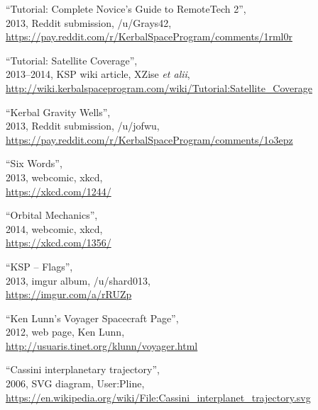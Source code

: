 \begin{thebibliography}{99}
“Tutorial: Complete Novice's Guide to RemoteTech 2”, \\
2013, Reddit submission, /u/Grays42, \\
\url{https://pay.reddit.com/r/KerbalSpaceProgram/comments/1rml0r}

“Tutorial: Satellite Coverage”, \\
2013--2014, KSP wiki article, XZise \emph{et alii}, \\
{\small\url{http://wiki.kerbalspaceprogram.com/wiki/Tutorial:Satellite_Coverage}}

“Kerbal Gravity Wells”, \\
2013, Reddit submission, /u/jofwu, \\
\url{https://pay.reddit.com/r/KerbalSpaceProgram/comments/1o3epz}

“Six Words”, \\
2013, webcomic, xkcd, \\
\url{https://xkcd.com/1244/}

“Orbital Mechanics”, \\
2014, webcomic, xkcd, \\
\url{https://xkcd.com/1356/}

“KSP -- Flags”, \\
2013, imgur album, /u/shard013, \\
\url{https://imgur.com/a/rRUZp}

“Ken Lunn's Voyager Spacecraft Page”, \\
2012, web page, Ken Lunn, \\
\url{http://usuaris.tinet.org/klunn/voyager.html}

“Cassini interplanetary trajectory”, \\
2006, SVG diagram, User:Pline, \\
{\footnotesize\url{https://en.wikipedia.org/wiki/File:Cassini_interplanet_trajectory.svg}}


\end{thebibliography}
